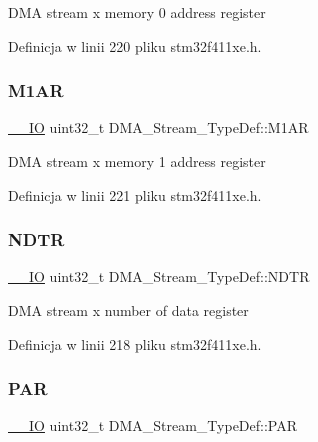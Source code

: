 D\+MA stream x memory 0 address register 

Definicja w linii 220 pliku stm32f411xe.\+h.

\mbox{\label{struct_d_m_a___stream___type_def_a142ca5a1145ba9cf4cfa557655af1c13}} 
\subsubsection{\texorpdfstring{M1\+AR}{M1AR}}
{\footnotesize\ttfamily \hyperlink{core__sc300_8h_aec43007d9998a0a0e01faede4133d6be}{\+\_\+\+\_\+\+IO} uint32\+\_\+t D\+M\+A\+\_\+\+Stream\+\_\+\+Type\+Def\+::\+M1\+AR}

D\+MA stream x memory 1 address register 

Definicja w linii 221 pliku stm32f411xe.\+h.

\mbox{\label{struct_d_m_a___stream___type_def_a2cc2a52628182f9e79ab1e49bb78a1eb}} 
\subsubsection{\texorpdfstring{N\+D\+TR}{NDTR}}
{\footnotesize\ttfamily \hyperlink{core__sc300_8h_aec43007d9998a0a0e01faede4133d6be}{\+\_\+\+\_\+\+IO} uint32\+\_\+t D\+M\+A\+\_\+\+Stream\+\_\+\+Type\+Def\+::\+N\+D\+TR}

D\+MA stream x number of data register 

Definicja w linii 218 pliku stm32f411xe.\+h.

\mbox{\label{struct_d_m_a___stream___type_def_adbeac1d47cb85ab52dac71d520273947}} 
\subsubsection{\texorpdfstring{P\+AR}{PAR}}
{\footnotesize\ttfamily \hyperlink{core__sc300_8h_aec43007d9998a0a0e01faede4133d6be}{\+\_\+\+\_\+\+IO} uint32\+\_\+t D\+M\+A\+\_\+\+Stream\+\_\+\+Type\+Def\+::\+P\+AR}

